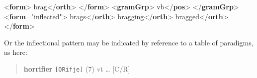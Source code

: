  \par\bgroup{}\exampleFont \begin{shaded}\noindent\mbox{}{<\textbf{form}>}\mbox{}\newline 
{}brag{</\textbf{orth}>}\mbox{}\newline 
{</\textbf{form}>}\mbox{}\newline 
{<\textbf{gramGrp}>}\mbox{}\newline 
{}vb{</\textbf{pos}>}\mbox{}\newline 
{</\textbf{gramGrp}>}\mbox{}\newline 
{<\textbf{form}\hspace*{1em}{type}="{inflected}">}\mbox{}\newline 
{}brags{</\textbf{orth}>}\mbox{}\newline 
{}bragging{</\textbf{orth}>}\mbox{}\newline 
{}bragged{</\textbf{orth}>}\mbox{}\newline 
{</\textbf{form}>}\end{shaded}\egroup\par \noindent  Or the inflectional pattern may be indicated by reference to a table of paradigms, as here:
\begin{quote}{\bfseries horrifier} \texttt{[ORifje]} (7) vt … [C/R]\end{quote}
